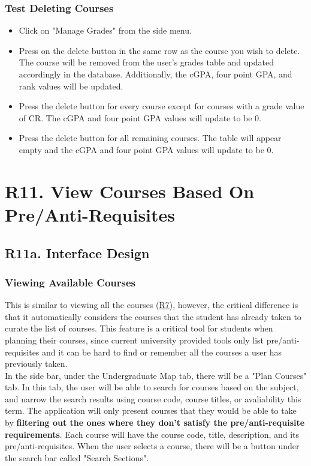 \documentclass[12pt, a4paper]{article}
\begin{document}
\subsubsection*{Test Deleting Courses}
\begin{itemize}
\item Click on "Manage Grades" from the side menu.
\item Press on the delete button in the same row as the course you wish to delete. The course will be removed from the user's grades table and updated accordingly in the database. Additionally, the cGPA, four point GPA, and rank values will be updated.
\item Press the delete button for every course except for courses with a grade value of CR. The cGPA and four point GPA values will update to be 0.
\item Press the delete button for all remaining courses. The table will appear empty and the cGPA and four point GPA values will update to be 0.
\end{itemize}

\section*{R11. View Courses Based On Pre/Anti-Requisites}
\label{sec:R11}
\subsection*{R11a. Interface Design}
\subsubsection*{Viewing Available Courses}
This is similar to viewing all the courses (\underline{\hyperref[sec:R7]{R7}}), however, the critical difference is that it automatically considers the courses that the student has already taken to curate the list of courses. This feature is a critical tool for students when planning their courses, since current university provided tools only list pre/anti-requisites and it can be hard to find or remember all the courses a user has previously taken.\\

In the side bar, under the Undergraduate Map tab, there will be a "Plan Courses" tab. In this tab, the user will be able to search for courses based on the subject, and narrow the search results using course code, course titles, or avaliability this term. The application will only present courses that they would be able to take by \textbf{filtering out the ones where they don't satisfy the pre/anti-requisite requirements}. Each course will have the course code, title, description, and its pre/anti-requisites. When the user selects a course, there will be a button under the search bar called "Search Sections".
\end{document}

